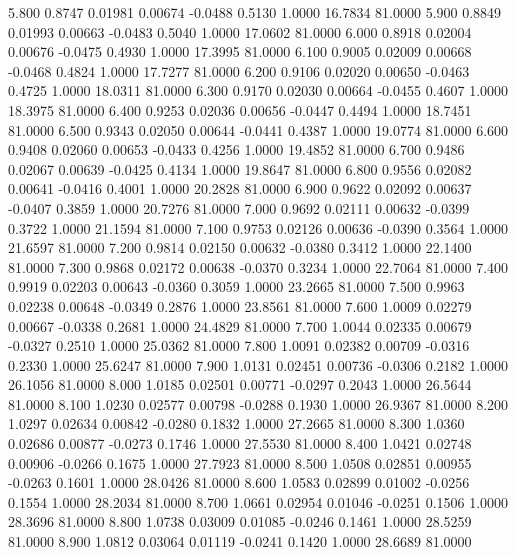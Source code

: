    5.800   0.8747   0.01981   0.00674  -0.0488   0.5130   1.0000  16.7834  81.0000
   5.900   0.8849   0.01993   0.00663  -0.0483   0.5040   1.0000  17.0602  81.0000
   6.000   0.8918   0.02004   0.00676  -0.0475   0.4930   1.0000  17.3995  81.0000
   6.100   0.9005   0.02009   0.00668  -0.0468   0.4824   1.0000  17.7277  81.0000
   6.200   0.9106   0.02020   0.00650  -0.0463   0.4725   1.0000  18.0311  81.0000
   6.300   0.9170   0.02030   0.00664  -0.0455   0.4607   1.0000  18.3975  81.0000
   6.400   0.9253   0.02036   0.00656  -0.0447   0.4494   1.0000  18.7451  81.0000
   6.500   0.9343   0.02050   0.00644  -0.0441   0.4387   1.0000  19.0774  81.0000
   6.600   0.9408   0.02060   0.00653  -0.0433   0.4256   1.0000  19.4852  81.0000
   6.700   0.9486   0.02067   0.00639  -0.0425   0.4134   1.0000  19.8647  81.0000
   6.800   0.9556   0.02082   0.00641  -0.0416   0.4001   1.0000  20.2828  81.0000
   6.900   0.9622   0.02092   0.00637  -0.0407   0.3859   1.0000  20.7276  81.0000
   7.000   0.9692   0.02111   0.00632  -0.0399   0.3722   1.0000  21.1594  81.0000
   7.100   0.9753   0.02126   0.00636  -0.0390   0.3564   1.0000  21.6597  81.0000
   7.200   0.9814   0.02150   0.00632  -0.0380   0.3412   1.0000  22.1400  81.0000
   7.300   0.9868   0.02172   0.00638  -0.0370   0.3234   1.0000  22.7064  81.0000
   7.400   0.9919   0.02203   0.00643  -0.0360   0.3059   1.0000  23.2665  81.0000
   7.500   0.9963   0.02238   0.00648  -0.0349   0.2876   1.0000  23.8561  81.0000
   7.600   1.0009   0.02279   0.00667  -0.0338   0.2681   1.0000  24.4829  81.0000
   7.700   1.0044   0.02335   0.00679  -0.0327   0.2510   1.0000  25.0362  81.0000
   7.800   1.0091   0.02382   0.00709  -0.0316   0.2330   1.0000  25.6247  81.0000
   7.900   1.0131   0.02451   0.00736  -0.0306   0.2182   1.0000  26.1056  81.0000
   8.000   1.0185   0.02501   0.00771  -0.0297   0.2043   1.0000  26.5644  81.0000
   8.100   1.0230   0.02577   0.00798  -0.0288   0.1930   1.0000  26.9367  81.0000
   8.200   1.0297   0.02634   0.00842  -0.0280   0.1832   1.0000  27.2665  81.0000
   8.300   1.0360   0.02686   0.00877  -0.0273   0.1746   1.0000  27.5530  81.0000
   8.400   1.0421   0.02748   0.00906  -0.0266   0.1675   1.0000  27.7923  81.0000
   8.500   1.0508   0.02851   0.00955  -0.0263   0.1601   1.0000  28.0426  81.0000
   8.600   1.0583   0.02899   0.01002  -0.0256   0.1554   1.0000  28.2034  81.0000
   8.700   1.0661   0.02954   0.01046  -0.0251   0.1506   1.0000  28.3696  81.0000
   8.800   1.0738   0.03009   0.01085  -0.0246   0.1461   1.0000  28.5259  81.0000
   8.900   1.0812   0.03064   0.01119  -0.0241   0.1420   1.0000  28.6689  81.0000
